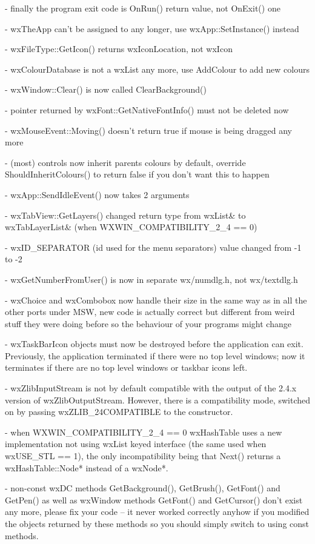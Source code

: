 - finally the program exit code is OnRun() return value, not OnExit() one

- wxTheApp can't be assigned to any longer, use wxApp::SetInstance() instead

- wxFileType::GetIcon() returns wxIconLocation, not wxIcon

- wxColourDatabase is not a wxList any more, use AddColour to add new colours

- wxWindow::Clear() is now called ClearBackground()

- pointer returned by wxFont::GetNativeFontInfo() must not be deleted now

- wxMouseEvent::Moving() doesn't return true if mouse is being dragged any more

- (most) controls now inherit parents colours by default, override
  ShouldInheritColours() to return false if you don't want this to happen

- wxApp::SendIdleEvent() now takes 2 arguments

- wxTabView::GetLayers() changed return type from wxList& to wxTabLayerList&
  (when WXWIN\_COMPATIBILITY\_2\_4 == 0)

- wxID\_SEPARATOR (id used for the menu separators) value changed from -1 to -2

- wxGetNumberFromUser() is now in separate wx/numdlg.h, not wx/textdlg.h

- wxChoice and wxCombobox now handle their size in the same way as in all the
  other ports under MSW, new code is actually correct but different from weird
  stuff they were doing before so the behaviour of your programs might change

- wxTaskBarIcon objects must now be destroyed before the application can exit.
  Previously, the application terminated if there were no top level windows;
  now it terminates if there are no top level windows or taskbar icons left.

- wxZlibInputStream is not by default compatible with the output of the
  2.4.x version of wxZlibOutputStream. However, there is a compatibility mode,
  switched on by passing wxZLIB\_24COMPATIBLE to the constructor.

- when WXWIN\_COMPATIBILITY\_2\_4 == 0 wxHashTable uses a new implementation
  not using wxList keyed interface (the same used when wxUSE\_STL == 1),
  the only incompatibility being that Next() returns a wxHashTable::Node*
  instead of a wxNode*.

- non-const wxDC methods GetBackground(), GetBrush(), GetFont() and GetPen()
  as well as wxWindow methods GetFont() and GetCursor() don't exist any more,
  please fix your code -- it never worked correctly anyhow if you modified the
  objects returned by these methods so you should simply switch to using const
  methods.

